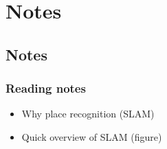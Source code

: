 \section{Notes}

\subsection{Notes}

\begin{frame}
    \frametitle{Reading notes}
    \begin{itemize}
        \item Why place recognition (SLAM)
        \item Quick overview of SLAM (figure)
    \end{itemize}
\end{frame}

